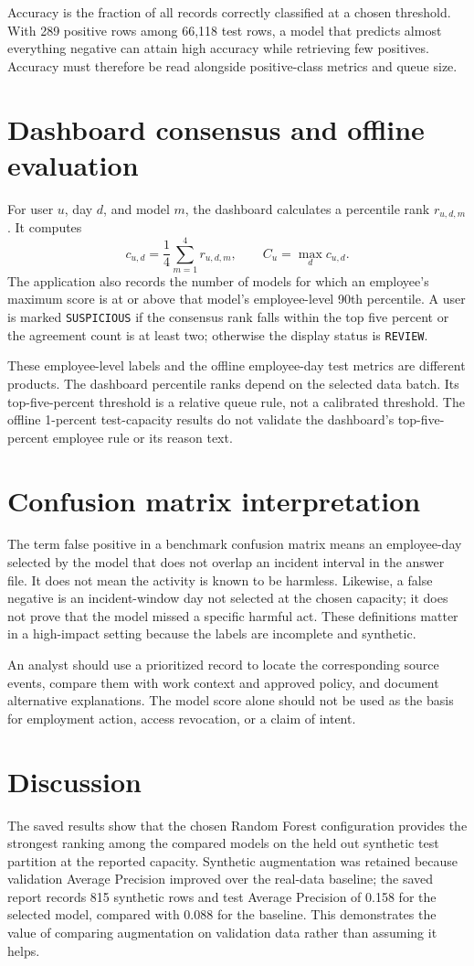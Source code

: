 \documentclass[12pt,a4paper,oneside]{report}
\newcommand{\code}[1]{\texttt{\small #1}}
\begin{document}
Accuracy is the fraction of all records correctly classified at a
chosen threshold. With 289 positive rows among 66,118 test rows, a
model that predicts almost everything negative can attain high
accuracy while retrieving few positives. Accuracy must therefore be
read alongside positive-class metrics and queue size.

\section{Dashboard consensus and offline evaluation}
For user \(u\), day \(d\), and model \(m\), the dashboard calculates a
percentile rank \(r_{u,d,m}\). It computes
\[
c_{u,d}=\frac{1}{4}\sum_{m=1}^{4}r_{u,d,m},
\qquad C_u=\max_d c_{u,d}.
\]
The application also records the number of models for which an
employee's maximum score is at or above that model's employee-level
90th percentile. A user is marked \code{SUSPICIOUS} if the consensus
rank falls within the top five percent or the agreement count is at
least two; otherwise the display status is \code{REVIEW}.

These employee-level labels and the offline employee-day test metrics
are different products. The dashboard percentile ranks depend on the
selected data batch. Its top-five-percent threshold is a relative
queue rule, not a calibrated threshold. The offline 1-percent
test-capacity results do not validate the dashboard's top-five-percent
employee rule or its reason text.

\section{Confusion matrix interpretation}
The term false positive in a benchmark confusion matrix means an
employee-day selected by the model that does not overlap an incident
interval in the answer file. It does not mean the activity is known to
be harmless. Likewise, a false negative is an incident-window day not
selected at the chosen capacity; it does not prove that the model
missed a specific harmful act. These definitions matter in a
high-impact setting because the labels are incomplete and synthetic.

An analyst should use a prioritized record to locate the corresponding
source events, compare them with work context and approved policy, and
document alternative explanations. The model score alone should not be
used as the basis for employment action, access revocation, or a claim
of intent.

\section{Discussion}
The saved results show that the chosen Random Forest configuration
provides the strongest ranking among the compared models on the held
out synthetic test partition at the reported capacity. Synthetic
augmentation was retained because validation Average Precision
improved over the real-data baseline; the saved report records 815
synthetic rows and test Average Precision of 0.158 for the selected
model, compared with 0.088 for the baseline. This demonstrates the
value of comparing augmentation on validation data rather than
assuming it helps.
\end{document}

